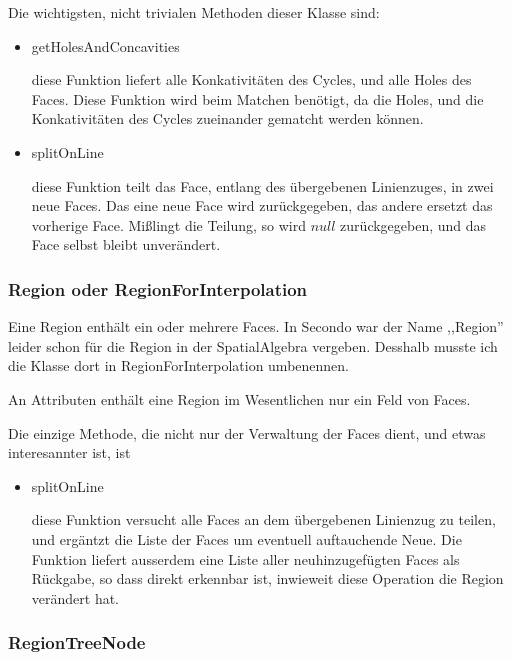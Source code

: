 Die wichtigsten, nicht trivialen Methoden dieser Klasse sind:

\begin{itemize}

\item getHolesAndConcavities

diese Funktion liefert alle Konkativitäten des Cycles, und alle Holes des Faces. Diese Funktion wird beim Matchen benötigt, da die Holes, und die Konkativitäten des Cycles zueinander gematcht werden können.

\item splitOnLine

diese Funktion teilt das Face, entlang des übergebenen Linienzuges, in zwei neue Faces. Das eine neue Face wird zurückgegeben, das andere ersetzt das vorherige Face. Mißlingt die Teilung, so wird $null$ zurückgegeben, und das Face selbst bleibt unverändert.

\end{itemize}

\subsubsection{Region oder RegionForInterpolation}

Eine Region enthält ein oder mehrere Faces. In Secondo war der Name ,,Region'' leider schon für die Region in der SpatialAlgebra vergeben. Desshalb musste ich die Klasse dort in RegionForInterpolation umbenennen.

An Attributen enthält eine Region im Wesentlichen nur ein Feld von Faces.

Die einzige Methode, die nicht nur der Verwaltung der Faces dient, und etwas interesannter ist, ist 
\begin{itemize}
\item splitOnLine

diese Funktion versucht alle Faces an dem übergebenen Linienzug zu teilen, und ergäntzt die Liste der Faces um eventuell auftauchende Neue. Die Funktion liefert ausserdem eine Liste aller neuhinzugefügten Faces als Rückgabe, so dass direkt erkennbar ist, inwieweit diese Operation die Region verändert hat.

\end{itemize}

\subsubsection{RegionTreeNode}

